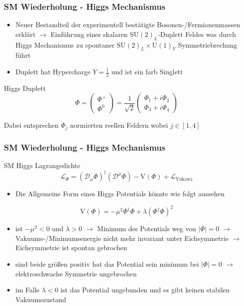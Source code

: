 \documentclass{beamer}
\begin{document}
\begin{frame}
\frametitle{SM Wiederholung - Higgs Mechanismus }
\begin{itemize}
\item Neuer Bestandteil der experimentell bestätigte Bosonen-/Fermionenmassen erklärt $\rightarrow$ Einführung eines skalaren $\text{SU}(2)_{L}$-Duplett Feldes was durch Higgs Mechanismus zu spontaner $\text{SU}(2)_{L}\times\text{U}(1)_{Y}$ Symmetriebrechung führt
\item Duplett hat Hypercharge $Y=\frac{1}{2}$ und ist ein farb Singlett 
\end{itemize}

\begin{block}{Higgs Duplett}
\begin{equation*}
\Phi=\left( \begin{array}{c} \Phi^{+}\\ \Phi^{0} \end{array}\right)= \frac{1}{\sqrt{2}}\left( \begin{array}{c} \Phi_{1}+i\Phi_{2}\\ \Phi_{3}+i\Phi_{4} \end{array}\right)
\end{equation*}
\end{block}
Dabei entsprechen $\Phi_{j}$  normierten reellen Feldern wobei $j \in [1,4] $
\end{frame}

\begin{frame}
\frametitle{SM Wiederholung - Higgs Mechanismus }

\begin{block}{SM Higgs Lagrangedichte}
\begin{equation*}
\mathscr{L}_{\Phi}=(\mathscr{D}_{\mu}\Phi)^{\dagger}(\mathscr{D}^{\mu}\Phi) - \text{V}(\Phi) + \mathscr{L}_{\text{Yukawa}}
\end{equation*}
\end{block}
\begin{itemize}
\item Die Allgemeine Form eines Higgs Potentials könnte wie folgt aussehen 
\end{itemize}
\begin{equation*}
 \text{V}(\Phi)=-\mu^{2} \Phi^{\dagger}\Phi +\lambda ( \Phi^{\dagger}\Phi)^{2}
\end{equation*}

\begin{itemize}
\item ist $-\mu^{2}<0$ und $\lambda>0$  $\rightarrow$ Minimum des Potentials weg von $|\Phi|=0$ $\rightarrow$ Vakuums-/Minimumsenergie nicht mehr invariant unter Eichsymmetrie $\rightarrow$ Eichsymmetrie ist spontan gebrochen
\item sind beide größen positiv hat das Potential sein minimum bei  $|\Phi|=0$ $ \rightarrow$ elektroschwache Symmetrie ungebrochen
\item im Falle $\lambda<0$ ist das Potential ungebunden und es gibt keinen stabilen Vakuumszustand
\end{itemize}
\end{frame}
\end{document}
